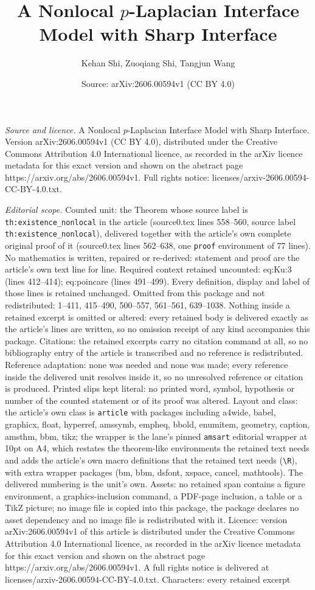 \documentclass[10pt,a4paper]{amsart}
\title[A Nonlocal $p$-Laplacian Interface Model with Sharp Interfac]{A Nonlocal $p$-Laplacian Interface Model with Sharp Interface}
\author{Kehan Shi, Zuoqiang Shi, Tangjun Wang}
\date{Source: arXiv:2606.00594v1 (CC BY 4.0)}
\begin{document}
\maketitle

\noindent\emph{Source and licence.} A Nonlocal $p$-Laplacian Interface Model with Sharp Interface. Version arXiv:2606.00594v1 (CC BY 4.0), distributed under the Creative Commons Attribution 4.0 International licence, as recorded in the arXiv licence metadata for this exact version and shown on the abstract page https://arxiv.org/abs/2606.00594v1. Full rights notice: licenses/arxiv-2606.00594-CC-BY-4.0.txt.\par\smallskip

\noindent\textit{Editorial scope.} Counted unit: the Theorem whose source label is \texttt{th:existence\_nonlocal} in the article (source0.tex lines 558--560, source label \texttt{th:existence\_nonlocal}), delivered together with the article's own complete original proof of it (source0.tex lines 562--638, one \texttt{proof} environment of 77 lines). No mathematics is written, repaired or re-derived: statement and proof are the article's own text line for line. Required context retained uncounted: eq:Ku:3 (lines 412--414); eq:poincare (lines 491--499). Every definition, display and label of those lines is retained unchanged. Omitted from this package and not redistributed: 1--411, 415--490, 500--557, 561--561, 639--1038. Nothing inside a retained excerpt is omitted or altered: every retained body is delivered exactly as the article's lines are written, so no omission receipt of any kind accompanies this package. Citations: the retained excerpts carry no citation command at all, so no bibliography entry of the article is transcribed and no reference is redistributed. Reference adaptation: none was needed and none was made; every reference inside the delivered unit resolves inside it, so no unresolved reference or citation is produced. Printed slips kept literal: no printed word, symbol, hypothesis or number of the counted statement or of its proof was altered. Layout and class: the article's own class is \texttt{article} with packages including a4wide, babel, graphicx, float, hyperref, amssymb, empheq, bbold, enumitem, geometry, caption, amsthm, bbm, tikz; the wrapper is the lane's pinned \texttt{amsart} editorial wrapper at 10pt on A4, which restates the theorem-like environments the retained text needs and adds the article's own macro definitions that the retained text needs (\texttt{\textbackslash R}), with extra wrapper packages (bm, bbm, dsfont, xspace, cancel, mathtools). The delivered numbering is the unit's own. Assets: no retained span contains a figure environment, a graphics-inclusion command, a PDF-page inclusion, a table or a TikZ picture; no image file is copied into this package, the package declares no asset dependency and no image file is redistributed with it. Licence: version arXiv:2606.00594v1 of this article is distributed under the Creative Commons Attribution 4.0 International licence, as recorded in the arXiv licence metadata for this exact version and shown on the abstract page https://arxiv.org/abs/2606.00594v1. A full rights notice is delivered at licenses/arxiv-2606.00594-CC-BY-4.0.txt. Characters: every retained excerpt 
\end{document}
